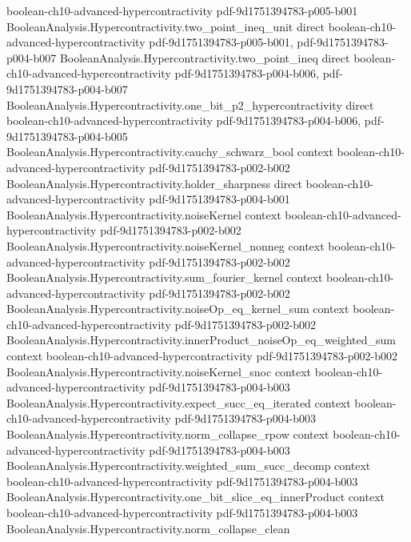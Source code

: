 \begin{theorem}
  {boolean-ch10-advanced-hypercontractivity}
  {pdf-9d1751394783-p005-b001}
\proofstep
  {BooleanAnalysis.Hypercontractivity.two_point_ineq_unit}
  {direct}
  {boolean-ch10-advanced-hypercontractivity}
  {pdf-9d1751394783-p005-b001,
    pdf-9d1751394783-p004-b007}
\proofstep
  {BooleanAnalysis.Hypercontractivity.two_point_ineq}
  {direct}
  {boolean-ch10-advanced-hypercontractivity}
  {pdf-9d1751394783-p004-b006,
    pdf-9d1751394783-p004-b007}
\proofstep
  {BooleanAnalysis.Hypercontractivity.one_bit_p2_hypercontractivity}
  {direct}
  {boolean-ch10-advanced-hypercontractivity}
  {pdf-9d1751394783-p004-b006,
    pdf-9d1751394783-p004-b005}
\proofstep
  {BooleanAnalysis.Hypercontractivity.cauchy_schwarz_bool}
  {context}
  {boolean-ch10-advanced-hypercontractivity}
  {pdf-9d1751394783-p002-b002}
\proofstep
  {BooleanAnalysis.Hypercontractivity.holder_sharpness}
  {direct}
  {boolean-ch10-advanced-hypercontractivity}
  {pdf-9d1751394783-p004-b001}
\proofstep
  {BooleanAnalysis.Hypercontractivity.noiseKernel}
  {context}
  {boolean-ch10-advanced-hypercontractivity}
  {pdf-9d1751394783-p002-b002}
\proofstep
  {BooleanAnalysis.Hypercontractivity.noiseKernel_nonneg}
  {context}
  {boolean-ch10-advanced-hypercontractivity}
  {pdf-9d1751394783-p002-b002}
\proofstep
  {BooleanAnalysis.Hypercontractivity.sum_fourier_kernel}
  {context}
  {boolean-ch10-advanced-hypercontractivity}
  {pdf-9d1751394783-p002-b002}
\proofstep
  {BooleanAnalysis.Hypercontractivity.noiseOp_eq_kernel_sum}
  {context}
  {boolean-ch10-advanced-hypercontractivity}
  {pdf-9d1751394783-p002-b002}
\proofstep
  {BooleanAnalysis.Hypercontractivity.innerProduct_noiseOp_eq_weighted_sum}
  {context}
  {boolean-ch10-advanced-hypercontractivity}
  {pdf-9d1751394783-p002-b002}
\proofstep
  {BooleanAnalysis.Hypercontractivity.noiseKernel_snoc}
  {context}
  {boolean-ch10-advanced-hypercontractivity}
  {pdf-9d1751394783-p004-b003}
\proofstep
  {BooleanAnalysis.Hypercontractivity.expect_succ_eq_iterated}
  {context}
  {boolean-ch10-advanced-hypercontractivity}
  {pdf-9d1751394783-p004-b003}
\proofstep
  {BooleanAnalysis.Hypercontractivity.norm_collapse_rpow}
  {context}
  {boolean-ch10-advanced-hypercontractivity}
  {pdf-9d1751394783-p004-b003}
\proofstep
  {BooleanAnalysis.Hypercontractivity.weighted_sum_succ_decomp}
  {context}
  {boolean-ch10-advanced-hypercontractivity}
  {pdf-9d1751394783-p004-b003}
\proofstep
  {BooleanAnalysis.Hypercontractivity.one_bit_slice_eq_innerProduct}
  {context}
  {boolean-ch10-advanced-hypercontractivity}
  {pdf-9d1751394783-p004-b003}
\proofstep
  {BooleanAnalysis.Hypercontractivity.norm_collapse_clean}

\end{theorem}
